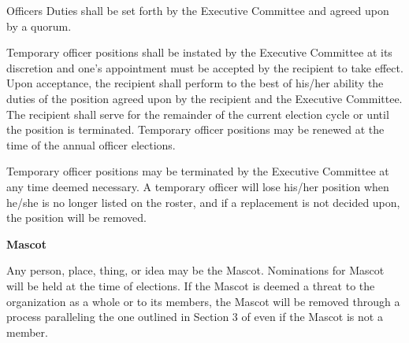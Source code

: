 {\begin{article}{Officers}
	Duties shall be set forth by the Executive Committee and agreed upon by a quorum.

	Temporary officer positions shall be instated by the Executive Committee at its discretion and one's appointment must be accepted by the recipient to take effect.  Upon acceptance, the recipient shall perform to the best of his/her ability the duties of the position agreed upon by the recipient and the Executive Committee.  The recipient shall serve for the remainder of the current election cycle or until the position is terminated.  Temporary officer positions may be renewed at the time of the annual officer elections.

	Temporary officer positions may be terminated by the Executive Committee at any time deemed necessary.  A temporary officer will lose his/her position when he/she is no longer listed on the roster, and if a replacement is not decided upon, the position will be removed.
	\item \textbf{Mascot}

	Any person, place, thing, or idea may be the Mascot.  Nominations for Mascot will be held at the time of elections.  If the Mascot is deemed a threat to the organization as a whole or to its members, the Mascot will be removed through a process paralleling the one outlined in Section 3 of  even if the Mascot is not a member.
\end{article}
}